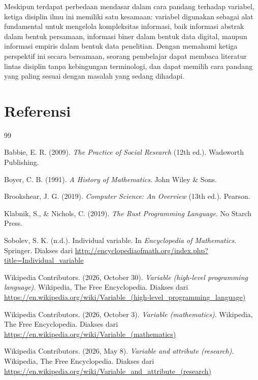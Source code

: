 \documentclass[11pt,a4paper]{article}
\begin{document}
Meskipun terdapat perbedaan mendasar dalam cara pandang terhadap variabel, ketiga disiplin ilmu ini memiliki satu kesamaan: variabel digunakan sebagai alat fundamental untuk mengelola kompleksitas informasi, baik informasi abstrak dalam bentuk persamaan, informasi biner dalam bentuk data digital, maupun informasi empiris dalam bentuk data penelitian. Dengan memahami ketiga perspektif ini secara bersamaan, seorang pembelajar dapat membaca literatur lintas disiplin tanpa kebingungan terminologi, dan dapat memilih cara pandang yang paling sesuai dengan masalah yang sedang dihadapi.

\newpage
\section*{Referensi}

\begin{thebibliography}{99}

	Babbie, E. R. (2009). \textit{The Practice of Social Research} (12th ed.). Wadsworth Publishing.

	Boyer, C. B. (1991). \textit{A History of Mathematics}. John Wiley \& Sons.

	Brookshear, J. G. (2019). \textit{Computer Science: An Overview} (13th ed.). Pearson.

	Klabnik, S., \& Nichols, C. (2019). \textit{The Rust Programming Language}. No Starch Press.

	Sobolev, S. K. (n.d.). Individual variable. In \textit{Encyclopedia of Mathematics}. Springer. Diakses dari \url{http://encyclopediaofmath.org/index.php?title=Individual_variable}

	Wikipedia Contributors. (2026, October 30). \textit{Variable (high-level programming language)}. Wikipedia, The Free Encyclopedia. Diakses dari \url{https://en.wikipedia.org/wiki/Variable_(high-level_programming_language)}

	Wikipedia Contributors. (2026, October 3). \textit{Variable (mathematics)}. Wikipedia, The Free Encyclopedia. Diakses dari \url{https://en.wikipedia.org/wiki/Variable_(mathematics)}

	Wikipedia Contributors. (2026, May 8). \textit{Variable and attribute (research)}. Wikipedia, The Free Encyclopedia. Diakses dari \url{https://en.wikipedia.org/wiki/Variable_and_attribute_(research)}

\end{thebibliography}
\end{document}
